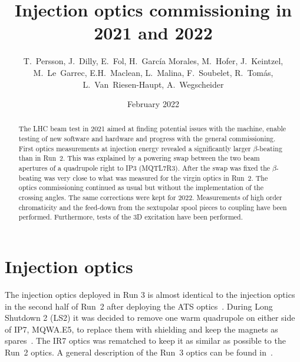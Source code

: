 \documentclass[a4paper]{cernatsnote}
\title{Injection optics commissioning in 2021 and 2022}
\author{ T.~Persson, J.~Dilly, E.~Fol, H.~Garc\'ia Morales, M.~Hofer,
 J.~Keintzel, M.~Le~Garrec, E.H.~Maclean, L.~Malina,  F.~Soubelet, R.~Tom\'as, L.~Van~Riesen-Haupt,  A.~Wegscheider}
\date{February 2022}
\begin{document}
\maketitle
\begin{abstract}
The LHC beam test in 2021 aimed at finding potential issues with the machine, enable testing of new software and hardware and progress with the general commissioning.
First optics measurements at injection energy revealed a significantly larger $\beta$-beating than in Run~2. 
This was explained by a powering swap between the two beam apertures of a quadrupole right to IP3 (MQTL7R3). After the swap was fixed the $\beta$-beating was very close to what was measured for the virgin optics in Run~2.
The  optics commissioning continued as usual but without the implementation of the crossing angles. 
The same corrections were kept for 2022.
Measurements of high order chromaticity and the feed-down from the sextupolar spool pieces to coupling have been performed. Furthermore, tests of the 3D excitation have been performed.
\end{abstract}

\section{Injection optics}
The injection optics deployed in Run 3 is almost identical to the injection optics in the second half of Run~2 after deploying the ATS optics~\cite{ats_stephane}.
During Long Shutdown 2 (LS2) it was decided to remove one warm quadrupole on either side of IP7, MQWA.E5, to replace them with shielding and keep the magnets as spares~\cite{roderik}. The IR7 optics was rematched to
keep it as similar as possible to the Run~2 optics.
A general description of the Run~3 optics can be found in~\cite{run3}.
\end{document}
